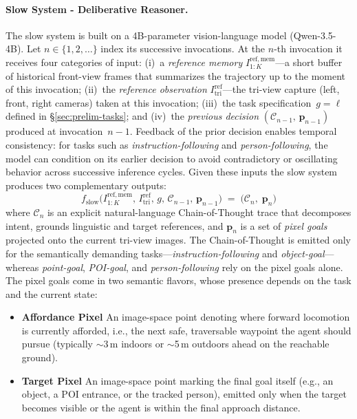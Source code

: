 \paragraph{Slow System - Deliberative Reasoner.}
The slow system is built on a 4B-parameter vision-language model
(Qwen-3.5-4B). Let $n\in\{1,2,\ldots\}$ index its successive
invocations.
At the $n$-th invocation it receives four categories of input:
(i)~a \textit{reference memory} $I^{\mathrm{ref,mem}}_{1:K}$---a short
buffer of historical front-view frames that summarizes the trajectory up
to the moment of this invocation;
(ii)~the \textit{reference observation} $I^{\mathrm{ref}}_{\mathrm{tri}}$---the
tri-view capture (left, front, right cameras) taken at this invocation;
(iii)~the task specification~$g=\ell$ defined in
\S\ref{sec:prelim-tasks}; and
(iv)~the \textit{previous decision} $(\mathcal{C}_{n-1},\,\mathbf{p}_{n-1})$
produced at invocation~$n{-}1$.
Feedback of the prior decision enables temporal consistency: for
tasks such as \textit{instruction-following} and \textit{person-following}, the model can
condition on its earlier decision to avoid contradictory or oscillating
behavior across successive inference cycles.
Given these inputs the slow system produces two complementary outputs:
\begin{equation}
f_\text{slow}\!\bigl(I^{\mathrm{ref,mem}}_{1:K},\, I^{\mathrm{ref}}_{\mathrm{tri}},\, g,\,
\mathcal{C}_{n-1},\,\mathbf{p}_{n-1}\bigr)
\;=\;\bigl(\mathcal{C}_n,\;\mathbf{p}_n\bigr)
\label{eq:slow}
\end{equation}
where $\mathcal{C}_n$ is an explicit natural-language Chain-of-Thought
trace that decomposes intent, grounds linguistic and target references, and $\mathbf{p}_n$ is a set of \textit{pixel
goals} projected onto the current tri-view images. The Chain-of-Thought
is emitted only for the semantically demanding tasks---\textit{instruction-following}
and \textit{object-goal}---whereas \textit{point-goal}, \textit{POI-goal}, and \textit{person-following}
rely on the pixel goals alone. The pixel goals
come in two semantic flavors, whose presence depends on the task and
the current state:
\begin{itemize}[nosep,leftmargin=1.2em]
\item \textbf{Affordance Pixel} An image-space point denoting where
  forward locomotion is currently afforded, i.e., the next safe,
  traversable waypoint the agent should pursue (typically
  $\sim$3\,m indoors or $\sim$5\,m outdoors ahead on the reachable
  ground).
\item \textbf{Target Pixel} An image-space point marking the final
  goal itself (e.g., an object, a POI entrance, or the tracked person),
  emitted only when the target becomes visible or the agent is within
  the final approach distance.
\end{itemize}
